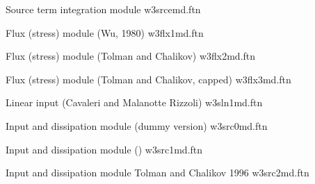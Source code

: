 \vspace{\baselineskip} \noindent
Source term integration module \hfill {\file w3srcemd.ftn}

\begin{flisti}
\end{flisti}

\noindent
Flux (stress) module (Wu, 1980) \hfill {\file w3flx1md.ftn}

\begin{flisti}
\end{flisti}

\noindent
Flux (stress) module (Tolman and Chalikov) \hfill {\file w3flx2md.ftn}

\begin{flisti}
\end{flisti}

\noindent
Flux (stress) module (Tolman and Chalikov, capped) \hfill {\file w3flx3md.ftn}

\begin{flisti}
\end{flisti}

\noindent
Linear input (Cavaleri and Malanotte Rizzoli) \hfill {\file w3sln1md.ftn}

\begin{flisti}
\end{flisti}

\noindent
Input and dissipation module (dummy version) \hfill {\file w3src0md.ftn}

\begin{flisti}
\end{flisti}

\noindent
Input and dissipation module () \hfill {\file w3src1md.ftn}

\begin{flisti}
\end{flisti}

\noindent
Input and dissipation module Tolman and Chalikov 1996 \hfill {\file w3src2md.ftn}

\begin{flisti}
\end{flisti}

